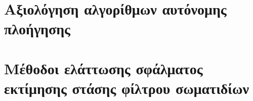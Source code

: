 \chapter{Αξιολόγηση αλγορίθμων αυτόνομης πλοήγησης}
  \label{part:02:chapter:01}
  

\chapter{Μέθοδοι ελάττωσης σφάλματος εκτίμησης στάσης φίλτρου σωματιδίων}
  \label{part:02:chapter:02}
  

